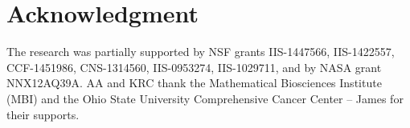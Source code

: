 \documentclass{article}
\begin{document}
	\printAffiliationsAndNotice{}  %
	
	
	
	
	
	
	
	
	
	
	
	
	
	
	
%	
	\section*{Acknowledgment}
	The research was partially supported by NSF grants IIS-1447566, IIS-1422557, CCF-1451986, CNS-1314560, IIS-0953274, IIS-1029711, and by NASA grant NNX12AQ39A. AA and KRC thank the Mathematical Biosciences Institute (MBI) and the Ohio State University Comprehensive Cancer Center – James for their supports. 
	
	
	
	
	
	\appendix
	
	
		
	
\end{document}
